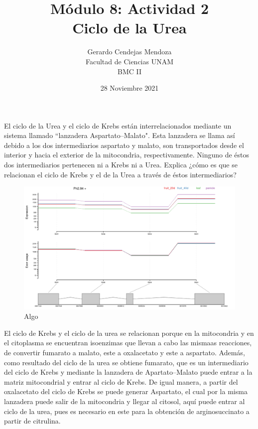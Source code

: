 \documentclass[12pt]{article}
\begin{document}
	
	\title {Módulo 8: Actividad 2\\Ciclo de la Urea}
	\date{28 Noviembre 2021}
	\author{Gerardo Cendejas Mendoza\\ Facultad de Ciencias UNAM\\BMC II}
	
	\maketitle
	
	El ciclo de la Urea y el ciclo de Krebs están interrelacionados mediante un sistema llamado ``lanzadera Aspartato--Malato". Esta lanzadera se llama así debido a los dos intermediarios aspartato y malato, son transportados desde el interior y hacia el exterior de la mitocondria, respectivamente. Ninguno de éstos dos intermediarios pertenecen ni a Krebs ni a Urea. Explica ¿cómo es que se relacionan el ciclo de Krebs y el de la Urea a través de éstos intermediarios?
	
	\FloatBarrier
	\begin{figure}[h]
		\centering
		\includegraphics[scale=0.3]{../2/Transcripts/6.png}
		\caption{Algo}
	\end{figure}
	\FloatBarrier
	
	\newpage
	
	El ciclo de Krebs y el ciclo de la urea se relacionan porque en la mitocondria y en el citoplasma se encuentran isoenzimas que llevan a cabo las mismaas reacciones, de convertir fumarato a malato, este a oxalacetato y este a aspartato. Además, como resultado del ciclo de la urea se obtiene fumarato, que es un intermediario del ciclo de Krebs y mediante la lanzadera de Apartato--Malato puede entrar a la matriz mitocondrial y entrar al ciclo de Krebs. De igual manera, a partir del oxalacetato del ciclo de Krebs se puede generar Aspartato, el cual por la misma lanzadera puede salir de la mitocondria y llegar al citosol, aquí puede entrar al ciclo de la urea, pues es necesario en este para la obtención de arginosuccinato a partir de citrulina.
	\newline
	
	
	
\end{document}
